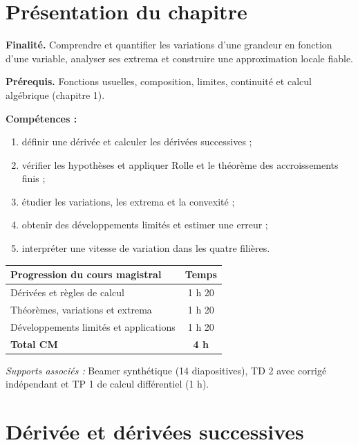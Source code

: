 \documentclass[11pt,a4paper,oneside]{article}
\begin{document}
\section*{Présentation du chapitre}
\begin{objectifbox}
\textbf{Finalité.} Comprendre et quantifier les variations d'une grandeur en fonction d'une variable, analyser ses extrema et construire une approximation locale fiable.

\textbf{Prérequis.} Fonctions usuelles, composition, limites, continuité et calcul algébrique (chapitre 1).

\textbf{Compétences :}
\begin{enumerate}
\item définir une dérivée et calculer les dérivées successives ;
\item vérifier les hypothèses et appliquer Rolle et le théorème des accroissements finis ;
\item étudier les variations, les extrema et la convexité ;
\item obtenir des développements limités et estimer une erreur ;
\item interpréter une vitesse de variation dans les quatre filières.
\end{enumerate}
\end{objectifbox}
\begin{center}\begin{tabularx}{.95\textwidth}{@{}Xc@{}}\toprule
\textbf{Progression du cours magistral} & \textbf{Temps}\\\midrule
Dérivées et règles de calcul & 1 h 20\\
Théorèmes, variations et extrema & 1 h 20\\
Développements limités et applications & 1 h 20\\\midrule
\textbf{Total CM} & \textbf{4 h}\\\bottomrule\end{tabularx}\end{center}
\textit{Supports associés :} Beamer synthétique (14 diapositives), TD 2 avec corrigé indépendant et TP 1 de calcul différentiel (1 h).

\setcounter{tocdepth}{1}\tableofcontents\clearpage

\section{Dérivée et dérivées successives}
\end{document}
